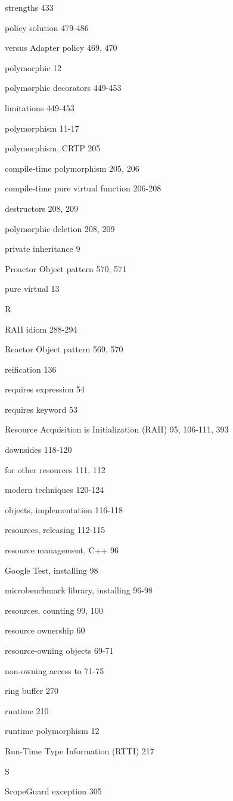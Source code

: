 strengths 433

policy solution 479-486

versus Adapter policy 469, 470

polymorphic 12

polymorphic decorators 449-453

limitations 449-453

polymorphism 11-17

polymorphism, CRTP 205

compile-time polymorphism 205, 206

compile-time pure virtual function 206-208

destructors 208, 209

polymorphic deletion 208, 209

private inheritance 9

Proactor Object pattern 570, 571

pure virtual 13

R

RAII idiom 288-294

Reactor Object pattern 569, 570

reification 136

requires expression 54

requires keyword 53

Resource Acquisition is Initialization (RAII) 95, 106-111, 393

downsides 118-120

for other resources 111, 112

modern techniques 120-124

objects, implementation 116-118

resources, releasing 112-115

resource management, C++ 96

Google Test, installing 98

microbenchmark library, installing 96-98

resources, counting 99, 100

resource ownership 60

resource-owning objects 69-71

non-owning access to 71-75

ring buffer 270

runtime 210

runtime polymorphism 12

Run-Time Type Information (RTTI) 217

S

ScopeGuard exception 305

